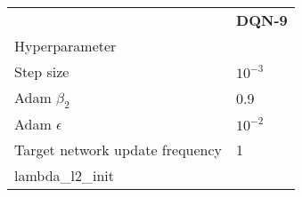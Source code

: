 \begin{tabular}{ll}
 & \bfseries DQN-9 \\
Hyperparameter &  \\
Step size & $10^{-3}$ \\
Adam $\beta_2$ & 0.9 \\
Adam $\epsilon$ & $10^{-2}$ \\
Target network update frequency & 1 \\
lambda_l2_init &  \\
\end{tabular}
